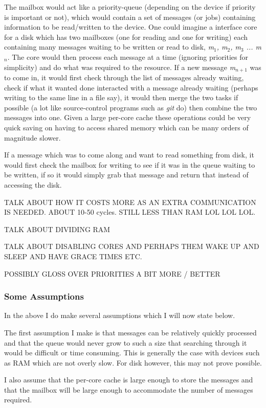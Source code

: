 \documentclass[journal]{IEEEtran}
\begin{document}
The mailbox would act like a priority-queue (depending on the device if priority is important or not), which would contain a set of messages (or jobs) containing information to be read/written to the device. One could imagine a interface core for a disk which has two mailboxes (one for reading and one for writing) each containing many messages waiting to be written or read to disk, \emph{m$_{1}$, m$_{2}$, m$_{3}$ ... m$_{n}$}. The core would then process each message at a time (ignoring priorities for simplicity) and do what was required to the resource. If a new message \emph{m$_{n+1}$} was to come in, it would first check through the list of messages already waiting, check if what it wanted done interacted with a message already waiting (perhaps writing to the same line in a file say), it would then merge the two tasks if possible (a lot like source-control programs such as \emph{git} do) then combine the two messages into one. Given a large per-core cache these operations could be very quick saving on having to access shared memory which can be many orders of magnitude slower. 

If a message which was to come along and want to read something from disk, it would first check the mailbox for writing to see if it was in the queue waiting to be written, if so it would simply grab that message and return that instead of accessing the disk.

TALK ABOUT HOW IT COSTS MORE AS AN EXTRA COMMUNICATION IS NEEDED. ABOUT 10-50 cycles. STILL LESS THAN RAM LOL LOL LOL.


TALK ABOUT DIVIDING RAM

TALK ABOUT DISABLING CORES AND PERHAPS THEM WAKE UP AND SLEEP AND HAVE GRACE TIMES ETC.

POSSIBLY GLOSS OVER PRIORITIES A BIT MORE / BETTER

\subsubsection{Some Assumptions}
In the above I do make several assumptions which I will now state below.

The first assumption I make is that messages can be relatively quickly processed and that the queue would never grow to such a size that searching through it would be difficult or time consuming. This is generally the case with devices such as RAM which are not overly slow. For disk however, this may not prove possible. 

I also assume that the per-core cache is large enough to store the messages and that the mailbox will be large enough to accommodate the number of messages required.
\end{document}
